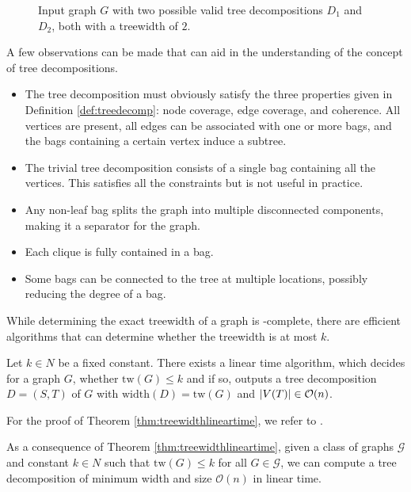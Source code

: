 \begin{example}
\begin{figure}[H]
\begin{minipage}[t]{.33\linewidth}
			\label{fig:treedecomp:tree2}
		\end{minipage}
		\caption{Input graph $G$ with two possible valid tree decompositions $D_1$ and $D_2$, both with a treewidth of $2$.}
		\label{fig:treedecomp}
	\end{figure}
	
	 A few observations can be made that can aid in the understanding of the concept of tree decompositions.
	\begin{itemize}
		\item The tree decomposition must obviously satisfy the three properties given in Definition \ref{def:treedecomp}: node coverage, edge coverage, and coherence. All vertices are present, all edges can be associated with one or more bags, and the bags containing a certain vertex induce a subtree.
		\item The trivial tree decomposition consists of a single bag containing all the vertices. This satisfies all the constraints but is not useful in practice.
		\item Any non-leaf bag splits the graph into multiple disconnected components, making it a separator for the graph.
		\item Each clique is fully contained in a bag.
		\item Some bags can be connected to the tree at multiple locations, possibly reducing the degree of a bag.
	\end{itemize}
\end{example}

While determining the exact treewidth of a graph is  \NP-complete, there are efficient algorithms that can determine whether the treewidth is at most $k$.

\begin{theorem}
	\label{thm:treewidthlineartime}
	Let $k\in N$ be a fixed constant. There exists a linear time algorithm, which decides for a graph $G$, whether $\mathrm{tw}(G) \leq k$ and if so, outputs a tree decomposition $D = (S, T)$ of $G$ with $\mathrm{width}(D) = \mathrm{tw}(G)$ and $|V(T)| \in \mathcal{O}(n)$.
\end{theorem}

For the proof of Theorem \ref{thm:treewidthlineartime}, we refer to \cite{Bod96}.

\begin{observation}
	\label{obs:treedecomplineartime}
	As a consequence of Theorem \ref{thm:treewidthlineartime}, given a class of graphs $\mathcal{G}$ and constant $k \in N$ such that $\mathrm{tw}(G) \leq k$ for all $G \in \mathcal{G}$, we can compute a tree decomposition of minimum width and size $\mathcal{O}(n)$ in linear time.
\end{observation}

